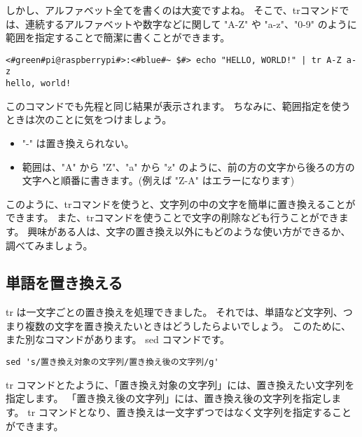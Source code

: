 しかし、アルファベット全てを書くのは大変ですよね。
そこで、trコマンドでは、連続するアルファベットや数字などに関して "A-Z" や "a-z"、"0-9"
のように範囲を指定することで簡潔に書くことができます。

\begin{lstlisting}[caption=範囲指定を使った置き換え, label=tr_range]
<#green#pi@raspberrypi#>:<#blue#~ $#> echo "HELLO, WORLD!" | tr A-Z a-z
hello, world!
\end{lstlisting}

このコマンドでも先程と同じ結果が表示されます。
ちなみに、範囲指定を使うときは次のことに気をつけましょう。
\begin{itemize}
    \item "-" は置き換えられない。
    \item 範囲は、"A" から "Z"、"a" から "z" のように、前の方の文字から後ろの方の文字へと順番に書きます。(例えば "Z-A"
          はエラーになります)
\end{itemize}

このように、trコマンドを使うと、文字列の中の文字を簡単に置き換えることができます。
また、trコマンドを使うことで文字の削除なども行うことができます。
興味がある人は、文字の置き換え以外にもどのような使い方ができるか、調べてみましょう。

\begin{tcolorbox}[title=\useOmetoi]
    \begin{enumerate}
    \end{enumerate}
\end{tcolorbox}

\subsection{単語を置き換える}
tr は一文字ごとの置き換えを処理できました。
それでは、単語など文字列、つまり複数の文字を置き換えたいときはどうしたらよいでしょう。
このために、また別なコマンドがあります。
sed コマンドです。

\begin{lstlisting}[caption=sed コマンドの\ruby{基本的}{き|ほん|てき}な使い方, label=sed_usage]
sed 's/置き換え対象の文字列/置き換え後の文字列/g'
\end{lstlisting}

tr コマンドとたように、「置き換え対象の文字列」には、置き換えたい文字列を指定します。
「置き換え後の文字列」には、置き換え後の文字列を指定します。
tr コマンドとなり、置き換えは一文字ずつではなく文字列を指定することができます。

